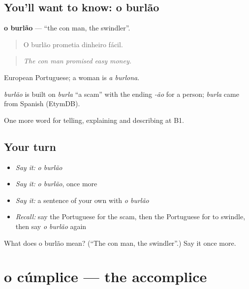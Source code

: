 \subsection*{You'll want to know: o burlão}
\textbf{o burlão} — \textquotedblleft{}the con man, the swindler\textquotedblright{}.

\begin{quote}
O burlão prometia dinheiro fácil.
\end{quote}

\begin{quote}
\emph{The con man promised easy money.}
\end{quote}

European Portuguese; a woman is \emph{a burlona}.

\begin{cousinweb}
\emph{burlão} is built on \emph{burla} \textquotedblleft{}a scam\textquotedblright{} with the ending \emph{-ão} for a person; \emph{burla} came from Spanish (EtymDB).
\end{cousinweb}

\begin{grammarlens}[title={What you've built}]
One more word for telling, explaining and describing at B1.
\end{grammarlens}

\subsection*{Your turn}
\begin{itemize}
\raggedright
  \item \emph{Say it:} \emph{o burlão}
  \item \emph{Say it:} \emph{o burlão}, once more
  \item \emph{Say it:} a sentence of your own with \emph{o burlão}
  \item \emph{Recall:} say the Portuguese for the scam, then the Portuguese for to swindle, then say \emph{o burlão} again
\end{itemize}

\begin{tcolorbox}[breakable,colback=teal!4,colframe=teal!35!black,title={Before you move on}]
What does o burlão mean? (\textquotedblleft{}The con man, the swindler\textquotedblright{}.) Say it once more.
\end{tcolorbox}
\section[o cúmplice]{o cúmplice — the accomplice}

